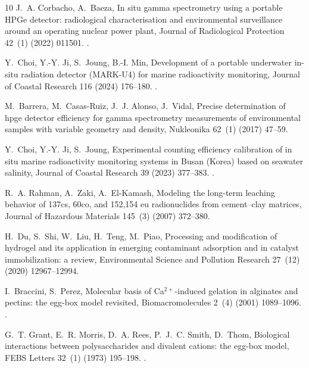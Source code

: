 \documentclass[preprint,12pt]{elsarticle}
\begin{document}
\begin{thebibliography}{10}
J.~A. Corbacho, A.~Baeza, In situ gamma spectrometry using a portable {HPGe} detector: radiological characterisation and environmental surveillance around an operating nuclear power plant, Journal of Radiological Protection 42~(1) (2022) 011501.
\newblock \href {https://doi.org/10.1088/1361-6498/ac4116} {}.

Y.~Choi, Y.-Y. Ji, S.~Joung, B.-I. Min, Development of a portable underwater in-situ radiation detector ({MARK-U4}) for marine radioactivity monitoring, Journal of Coastal Research 116 (2024) 176--180.
\newblock \href {https://doi.org/10.2112/JCR-SI116-036.1} {}.


M.~Barrera, M.~Casas-Ruiz, J.~J. Alonso, J.~Vidal, Precise determination of hpge detector efficiency for gamma spectrometry measurements of environmental samples with variable geometry and density, Nukleonika 62~(1) (2017) 47--59.

Y.~Choi, Y.-Y. Ji, S.~Joung, Experimental counting efficiency calibration of in situ marine radioactivity monitoring systems in {Busan} ({Korea}) based on seawater salinity, Journal of Coastal Research 39 (2023) 377--383.
\newblock \href {https://doi.org/10.2112/JCOASTRES-D-22TM-00013.1} {}.


R.~A. Rahman, A.~Zaki, A.~El-Kamash, Modeling the long-term leaching behavior of 137cs, 60co, and 152,154 eu radionuclides from cement--clay matrices, Journal of Hazardous Materials 145~(3) (2007) 372--380.


H.~Du, S.~Shi, W.~Liu, H.~Teng, M.~Piao, Processing and modification of hydrogel and its application in emerging contaminant adsorption and in catalyst immobilization: a review, Environmental Science and Pollution Research 27~(12) (2020) 12967--12994.

I.~Braccini, S.~Perez, Molecular basis of {Ca}$^{2+}$-induced gelation in alginates and pectins: the egg-box model revisited, Biomacromolecules 2~(4) (2001) 1089--1096.
\newblock \href {https://doi.org/10.1021/bm010008g} {}.

G.~T. Grant, E.~R. Morris, D.~A. Rees, P.~J.~C. Smith, D.~Thom, Biological interactions between polysaccharides and divalent cations: the egg-box model, FEBS Letters 32~(1) (1973) 195--198.
\newblock \href {https://doi.org/10.1016/0014-5793(73)80770-7} {}.


\end{thebibliography}
\end{document}
